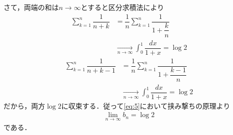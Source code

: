 \documentclass[../../main.tex]{subfiles}
\begin{document}
さて，両端の和は$n\to\infty$とすると区分求積法により
\begin{align}
  \sum_{k=1}^n\dfrac{1}{n+k}
  &=\dfrac{1}{n}\sum_{k=1}^n\dfrac{1}{1+\dfrac{k}{n}} \\
  &\xrightarrow[n\to\infty]{}\int_0^1\dfrac{dx}{1+x} =\log2
\end{align}
\begin{align}
  \sum_{k=1}^n\dfrac{1}{n+k-1}
  &=\dfrac{1}{n}\sum_{k=1}^n\dfrac{1}{1+\dfrac{k-1}{n}} \\
  &\xrightarrow[n\to\infty]{}\int_0^1\dfrac{dx}{1+x} =\log2
\end{align}
だから，両方$\log 2$に収束する．従って\cref{eq:5}において挟み撃ちの原理より
\begin{align}
  \lim_{n\to\infty}b_n=\log2
\end{align}
である．

\newpage
\end{document}
